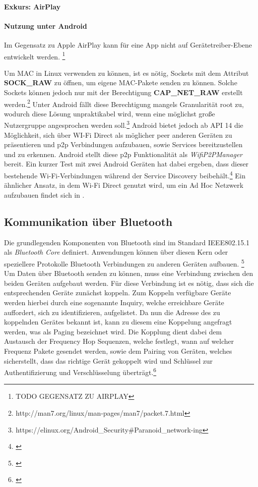         \paragraph{Exkurs: AirPlay}

    
        \paragraph{Nutzung unter Android}
        Im Gegensatz zu Apple AirPlay kann für eine App nicht auf Gerätetreiber-Ebene entwickelt werden.  \footnote{TODO GEGENSATZ ZU AIRPLAY} 

        Um MAC in Linux verwenden zu können, ist es nötig, Sockets mit dem Attribut {\bf SOCK\_RAW} zu öffnen,
        um eigene MAC-Pakete senden zu können. Solche Sockets können jedoch nur mit der Berechtigung {\bf CAP\_NET\_RAW} erstellt werden.\footnote{http://man7.org/linux/man-pages/man7/packet.7.html}
        Unter Android fällt diese Berechtigung mangels Granularität root zu, wodurch diese Lösung unpraktikabel wird,
        wenn eine möglichst große Nutzergruppe angesprochen werden soll.\footnote{https://elinux.org/Android\_Security\#Paranoid\_network-ing}
        Android bietet jedoch ab API 14 die Möglichkeit, sich über WI-Fi Direct als möglicher peer anderen Geräten zu präsentieren und
        p2p Verbindungen aufzubauen, sowie Services bereitzustellen und zu erkennen.
        Android stellt diese p2p Funktionalität als {\it WifiP2PManager} bereit. Ein kurzer Test mit zwei Android Geräten hat dabei ergeben,
        dass dieser bestehende Wi-Fi-Verbindungen während der Service Discovery beibehält.\footnote{\cite{test-repository}}
        Ein ähnlicher Ansatz, in dem Wi-Fi Direct genutzt wird, um ein Ad Hoc Netzwerk aufzubauen findet sich in \cite{Aneja}.

    \subsection{Kommunikation über Bluetooth}
        Die grundlegenden Komponenten von Bluetooth sind im Standard IEEE802.15.1 als {\it Bluetooth Core} definiert. Anwendungen können über diesen Kern oder speziellere Protokolle Bluetooth
        Verbindungen zu anderen Geräten aufbauen. \footnote{\cite[S.228]{Lueders}} 
        Um Daten über Bluetooth senden zu können, muss eine Verbindung zwischen den beiden Geräten aufgebaut werden. Für diese Verbindung ist es nötig,
        dass sich die entsprechenden Geräte zunächst koppeln. Zum Koppeln verfügbare Geräte werden hierbei durch eine sogenannte Inquiry, welche erreichbare Geräte auffordert,
        sich zu identifizieren, aufgelistet. Da nun die Adresse des zu koppelnden Gerätes bekannt ist, kann zu diesem eine Koppelung angefragt werden, was als Paging bezeichnet wird.
        Die Kopplung dient dabei dem Austausch der Frequency Hop Sequenzen, welche festlegt, wann auf welcher Frequenz Pakete gesendet werden, sowie dem Pairing von Geräten, welches sicherstellt,
        dass das richtige Gerät gekoppelt wird und Schlüssel zur Authentifizierung und Verschlüsselung überträgt.\footnote{\cite[S.402f.]{Sauter}}

